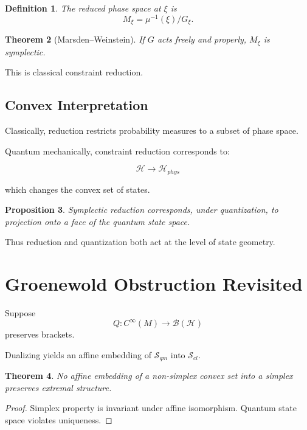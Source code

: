 \documentclass[11pt]{article}
\newtheorem{theorem}{Theorem}[section]
\newtheorem{definition}[theorem]{Definition}
\newtheorem{proposition}[theorem]{Proposition}
\begin{document}
\begin{definition}
The reduced phase space at $\xi$ is
\[
M_\xi = \mu^{-1}(\xi)/G_\xi.
\]
\end{definition}

\begin{theorem}[Marsden--Weinstein]
If $G$ acts freely and properly,
$M_\xi$ is symplectic.
\end{theorem}

This is classical constraint reduction.

\subsection{Convex Interpretation}

Classically,
reduction restricts probability measures
to a subset of phase space.

Quantum mechanically,
constraint reduction corresponds to:

\[
\mathcal{H} \to \mathcal{H}_{phys}
\]

which changes the convex set of states.

\begin{proposition}
Symplectic reduction corresponds,
under quantization,
to projection onto a face of the quantum state space.
\end{proposition}

Thus reduction and quantization
both act at the level of state geometry.

\section{Groenewold Obstruction Revisited}

Suppose
\[
Q: C^\infty(M) \to \mathcal{B}(\mathcal{H})
\]
preserves brackets.

Dualizing yields an affine embedding
of $\mathcal{S}_{qm}$ into $\mathcal{S}_{cl}$.

\begin{theorem}
No affine embedding of a non-simplex convex set
into a simplex preserves extremal structure.
\end{theorem}

\begin{proof}
Simplex property is invariant under affine isomorphism.
Quantum state space violates uniqueness.
\end{proof}
\end{document}
